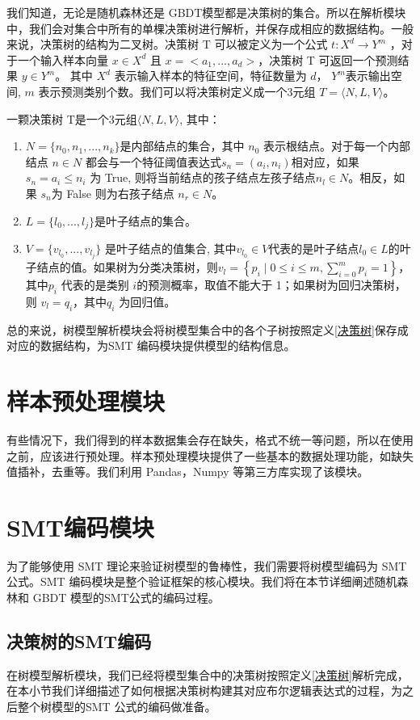 我们知道，无论是随机森林还是 GBDT模型都是决策树的集合。所以在解析模块中，我们会对集合中所有的单棵决策树进行解析，并保存成相应的数据结构。一般来说，决策树的结构为二叉树。决策树 T 可以被定义为一个公式  $t: X^{d} \rightarrow Y^{m}$ ，对于一个输入样本向量 $x\in X^d$ 且 $x=<a_1,...,a_d>$，决策树 T 可返回一个预测结果 $y\in Y^m$。 其中 $X^d$ 表示输入样本的特征空间，特征数量为 $d$， $Y^m$表示输出空间, $m$ 表示预测类别个数。我们可以将决策树定义成一个3元组 $T = \langle N,L,V \rangle$。
\begin{define}[决策树]\label{决策树}
一颗决策树 T是一个3元组$ \langle N,L,V \rangle$, 其中：
\begin{enumerate}
	\item  $N=\{n_0,n_1,...,n_k\}$是内部结点的集合，其中 $n_0$ 表示根结点。对于每一个内部结点 $n\in N$ 都会与一个特征阈值表达式$s_n=(a_i,n_i)$相对应，如果 $s_n=a_i\le n_i$ 为 True, 则将当前结点的孩子结点左孩子结点$n_l\in N$。相反，如果 $s_n$为 False 则为右孩子结点 $n_r\in N$。
	\item  $L = \{l_0,...,l_j\}$是叶子结点的集合。
	\item $V=\{v_{l_{0}},...,v_{l_{j}}\}$ 是叶子结点的值集合, 其中$v_{l_{0}}\in V$代表的是叶子结点$l_0\in L$的叶子结点的值。如果树为分类决策树，则$v_{l}=\left\{p_{i} \mid 0 \leq i \leq m, \sum_{i=0}^{m} p_{i}=1\right\}$，其中$p_i$ 代表的是类别 $i$的预测概率，取值不能大于 1；如果树为回归决策树，则 $v_l=q_i$，其中$q_i$ 为回归值。
\end{enumerate}
\end{define}
总的来说，树模型解析模块会将树模型集合中的各个子树按照定义\ref{决策树}保存成对应的数据结构，为SMT 编码模块提供模型的结构信息。

\section{样本预处理模块}
有些情况下，我们得到的样本数据集会存在缺失，格式不统一等问题，所以在使用之前，应该进行预处理。样本预处理模块提供了一些基本的数据处理功能，如缺失值插补，去重等。我们利用 Pandas，Numpy 等第三方库实现了该模块。

\section{SMT编码模块}
为了能够使用 SMT 理论来验证树模型的鲁棒性，我们需要将树模型编码为 SMT 公式。SMT 编码模块是整个验证框架的核心模块。我们将在本节详细阐述随机森林和 GBDT 模型的SMT公式的编码过程。

\subsection{决策树的SMT编码}
在树模型解析模块，我们已经将模型集合中的决策树按照定义\ref{决策树}解析完成，在本小节我们详细描述了如何根据决策树构建其对应布尔逻辑表达式的过程，为之后整个树模型的SMT 公式的编码做准备。

